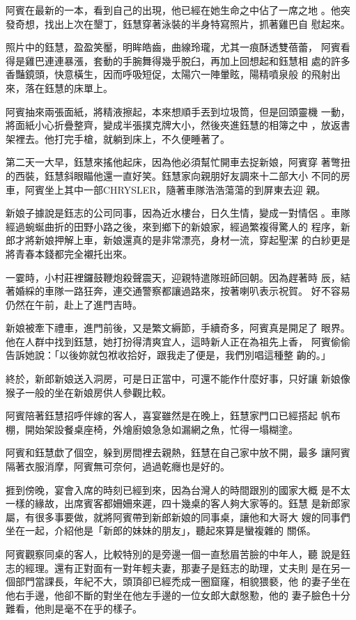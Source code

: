 阿賓在最新的一本，看到自己的出現，他已經在她生命之中佔了一席之地
。他突發奇想，找出上次在墾丁，鈺慧穿著泳裝的半身特寫照片，抓著雞巴自
慰起來。

照片中的鈺慧，盈盈笑靨，明眸皓齒，曲線玲瓏，尤其一痕酥透雙蓓蕾，
阿賓看得是雞巴連連暴漲，套動的手腕舞得幾乎脫臼，再加上回想起和鈺慧相
處的許多香豔鏡頭，快意橫生，因而呼吸短促，太陽穴一陣暈眩，陽精噴泉般
的飛射出來，落在鈺慧的床單上。

阿賓抽來兩張面紙，將精液擦起，本來想順手丟到垃圾筒，但是回頭靈機
一動，將面紙小心折疊整齊，變成半張撲克牌大小，然後夾進鈺慧的相簿之中
，放返書架裡去。他打完手槍，就躺到床上，不久便睡著了。

第二天一大早，鈺慧來搖他起床，因為他必須幫忙開車去捉新娘，阿賓穿
著彆扭的西裝，鈺慧斜眼瞄他還一直好笑。鈺慧家向親朋好友調來十二部大小
不同的房車，阿賓坐上其中一部CHRYSLER，隨著車隊浩浩蕩蕩的到屏東去迎
親。

新娘子據說是鈺志的公司同事，因為近水樓台，日久生情，變成一對情侶
。車隊經過蜿蜒曲折的田野小路之後，來到鄉下的新娘家，經過繁複得驚人的
程序，新郎才將新娘押解上車，新娘還真的是非常漂亮，身材一流，穿起聖潔
的白紗更是將青春本錢都完全襯托出來。

一霎時，小村莊裡鑼鼓鞭炮殺聲震天，迎親特遣隊班師回朝。因為趕著時
辰，結著婚綵的車隊一路狂奔，連交通警察都讓過路來，按著喇叭表示祝賀。
好不容易仍然在午前，赴上了進門吉時。

新娘被牽下禮車，進門前後，又是繁文縟節，手續奇多，阿賓真是開足了
眼界。他在人群中找到鈺慧，她打扮得清爽宜人，這時新人正在為祖先上香，
阿賓偷偷告訴她說：「以後妳就包袱收拾好，跟我走了便是，我們別唱這種整
齣的。」

終於，新郎新娘送入洞房，可是日正當中，可還不能作什麼好事，只好讓
新娘像猴子一般的坐在新娘房供人參觀比較。

阿賓陪著鈺慧招呼伴嫁的客人，喜宴雖然是在晚上，鈺慧家門口已經搭起
帆布棚，開始架設餐桌座椅，外燴廚娘急急如漏網之魚，忙得一塌糊塗。

阿賓和鈺慧歔了個空，躲到房間裡去親熱，鈺慧在自己家中放不開，最多
讓阿賓隔著衣服消摩，阿賓無可奈何，過過乾癮也是好的。

捱到傍晚，宴會入席的時刻已經到來，因為台灣人的時間跟別的國家大概
是不太一樣的緣故，出席賓客都姍姍來遲，四十幾桌的客人夠大家等的。鈺慧
是新郎家屬，有很多事要做，就將阿賓帶到新郎新娘的同事桌，讓他和大哥大
嫂的同事們坐在一起，介紹他是「新郎的妹妹的朋友」，聽起來算是蠻複雜的
關係。

阿賓觀察同桌的客人，比較特別的是旁邊一個一直愁眉苦臉的中年人，聽
說是鈺志的經理。還有正對面有一對年輕夫妻，那妻子是鈺志的助理，丈夫則
是在另一個部門當課長，年紀不大，頭頂卻已經禿成一圈窟窿，相貌猥褻，他
的妻子坐在他右手邊，他卻不斷的對坐在他左手邊的一位女郎大獻慇懃，他的
妻子臉色十分難看，他則是毫不在乎的樣子。

